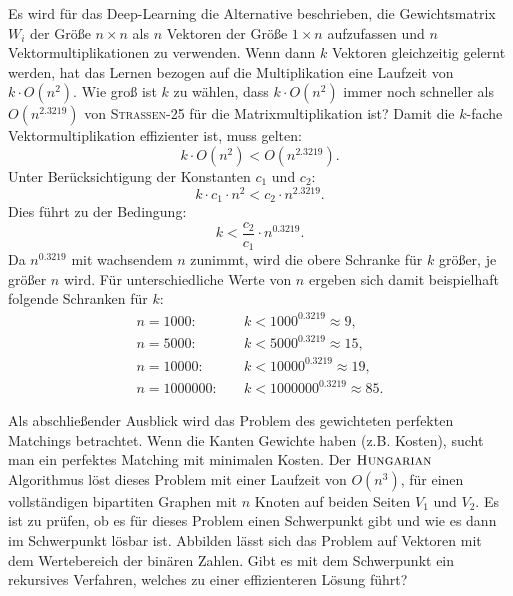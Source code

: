 \documentclass{report}
\numberwithin{equation}{section}
\begin{document}
Es wird für das Deep-Learning die Alternative beschrieben, die Gewichtsmatrix $W_i$ der Größe $n \times n$ als $n$ Vektoren der Größe $1 \times n$ aufzufassen und $n$ Vektormultiplikationen zu verwenden. Wenn dann $k$ Vektoren gleichzeitig gelernt werden, hat das Lernen bezogen auf die Multiplikation eine Laufzeit von $k \cdot O(n^2)$. Wie groß ist $k$ zu wählen, dass $k \cdot O(n^2)$ immer noch schneller als $O(n^{2.3219})$ von \textsc{Strassen-25} für die Matrixmultiplikation ist? Damit die $k$-fache Vektormultiplikation effizienter ist, muss gelten:
$$k \cdot O(n^2) < O(n^{2.3219}).$$
Unter Berücksichtigung der Konstanten $c_1$ und $c_2$:
$$k \cdot c_1 \cdot n^2 < c_2 \cdot n^{2.3219}.$$
Dies führt zu der Bedingung:
$$k < \frac{c_2}{c_1} \cdot n^{0.3219}.$$
Da $n^{0.3219}$ mit wachsendem $n$ zunimmt, wird die obere Schranke für $k$ größer, je größer $n$ wird. Für unterschiedliche Werte von $n$ ergeben sich damit beispielhaft folgende Schranken für $k$:
\begin{align*}
	n = 1000: \quad & k < 1000^{0.3219} \approx 9, \\
	n = 5000: \quad & k < 5000^{0.3219} \approx 15, \\
	n = 10000: \quad & k < 10000^{0.3219} \approx 19, \\
	n = 1000000: \quad & k < 1000000^{0.3219} \approx 85.
\end{align*}

Als abschließender Ausblick wird das Problem des gewichteten perfekten Matchings betrachtet. Wenn die Kanten Gewichte haben (z.B. Kosten), sucht man ein perfektes Matching mit minimalen Kosten. Der $\textsc{Hungarian}$ Algorithmus löst dieses Problem mit einer Laufzeit von $O(n^3)$, für einen vollständigen bipartiten Graphen mit $n$ Knoten auf beiden Seiten $V_1$ und $V_2$. Es ist zu prüfen, ob es für dieses Problem einen Schwerpunkt gibt und wie es dann im Schwerpunkt lösbar ist. Abbilden lässt sich das Problem auf Vektoren mit dem Wertebereich der binären Zahlen. Gibt es mit dem Schwerpunkt ein rekursives Verfahren, welches zu einer effizienteren Lösung führt?
\end{document}
